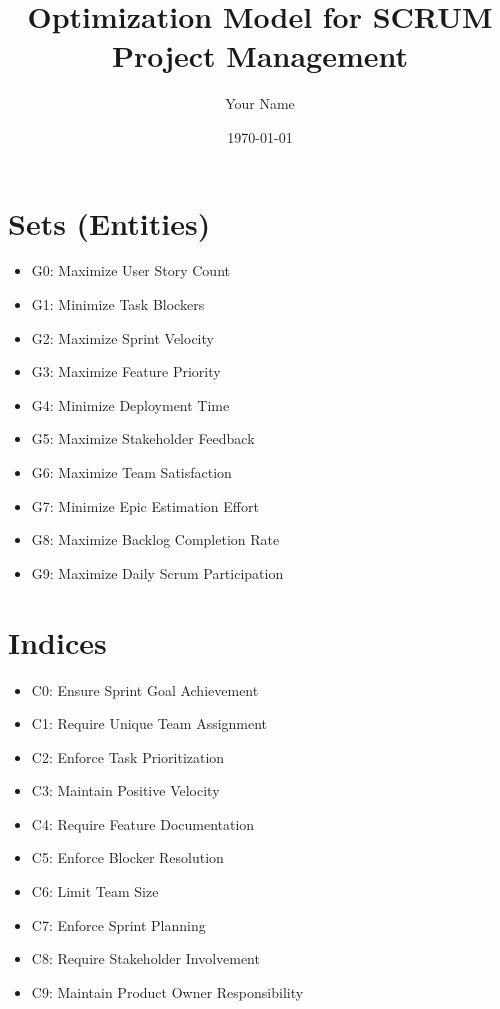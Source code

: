 \documentclass{article}
\title{Optimization Model for SCRUM Project Management}
\author{Your Name}
\date{\today}
\begin{document}
\maketitle

\tableofcontents

\section{Sets (Entities)}
\begin{itemize}
    \item G0: Maximize User Story Count
    \item G1: Minimize Task Blockers
    \item G2: Maximize Sprint Velocity
    \item G3: Maximize Feature Priority
    \item G4: Minimize Deployment Time
    \item G5: Maximize Stakeholder Feedback
    \item G6: Maximize Team Satisfaction
    \item G7: Minimize Epic Estimation Effort
    \item G8: Maximize Backlog Completion Rate
    \item G9: Maximize Daily Scrum Participation
\end{itemize}

\section{Indices}
\begin{itemize}
    \item C0: Ensure Sprint Goal Achievement
    \item C1: Require Unique Team Assignment
    \item C2: Enforce Task Prioritization
    \item C3: Maintain Positive Velocity
    \item C4: Require Feature Documentation
    \item C5: Enforce Blocker Resolution
    \item C6: Limit Team Size
    \item C7: Enforce Sprint Planning
    \item C8: Require Stakeholder Involvement
    \item C9: Maintain Product Owner Responsibility
\end{itemize}
\end{document}
